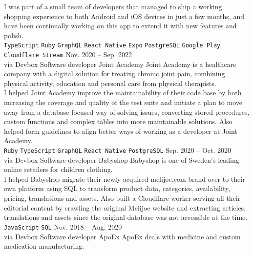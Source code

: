 \documentclass[9pt]{template} %
\begin{document}
\begin{entrylist}
{      I was part of a small team of developers that managed to ship a working
      shopping experience to both Android and iOS devices in just a few months,
      and have been continually working on this app to extend it with new
      features and polish.\\
      \texttt{TypeScript}\slashsep
      \texttt{Ruby}\slashsep
      \texttt{GraphQL}\slashsep
      \texttt{React Native}\slashsep
      \texttt{Expo}\slashsep
      \texttt{PostgreSQL}\slashsep
      \texttt{Google Play}\slashsep
      \texttt{Cloudflare Stream}
    }
  \entry
    {Nov. 2020 -- Sep. 2022\\\footnotesize{via Devbox}}
    {Software developer}
    {Joint Academy}
    {
      Joint Academy is a healthcare company with a digital solution for treating
      chronic joint pain, combining physical activity, education and personal care
      from physical therapists.\\

      I helped Joint Academy improve the maintainability of their code base by both
      increasing the coverage and quality of the test suite and initiate a plan to
      move away from a database focused way of solving issues, converting stored
      procedures, custom functions and complex tables into more maintainable solutions.
      Also helped form guidelines to align better ways of working as a developer at
      Joint Academy.\\
      \texttt{Ruby}\slashsep
      \texttt{TypeScript}\slashsep
      \texttt{GraphQL}
      \texttt{React Native}\slashsep
      \texttt{PostgreSQL}\slashsep
    }
  \entry
    {Sep. 2020 -- Oct. 2020\\\footnotesize{via Devbox}}
    {Software developer}
    {Babyshop}
    {Babyshop is one of Sweden's leading online retailers for children clothing.\\

      I helped Babyshop migrate their newly acquired melijoe.com brand over to their own platform using SQL to transform product data, categories, availability, pricing, translations and assets. Also built a Cloudflare worker serving all their editorial content by crawling the original Melijoe website and extracting articles, translations and assets since the original database was not accessible at the time.\\
      \texttt{JavaScript}\slashsep
      \texttt{SQL}
    }
  \entry
    {Nov. 2018 -- Aug. 2020\\\footnotesize{via Devbox}}
    {Software developer}
    {ApoEx}
    {ApoEx deals with medicine and custom medication manufacturing.\\

}
\end{entrylist}
\end{document}
